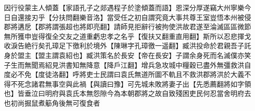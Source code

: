 因行役蒙主人傾蓋【家語孔子之郯遇程子於塗傾蓋而語】恩深分厚遂竊大州寧樂今日自還接刃乎【分扶問翻樂音洛】當受任之初自謂究竟大事共尊王室豈悟本州被侵郡將遘戹【郡將謂張超也將即亮翻】請師見拒辭行被拘使洪故君遂至淪滅區區微節無所獲申豈得復全交友之道重虧忠孝之名乎【復扶又翻重直用翻】斯所以忍悲揮戈收淚告絶行矣孔璋足下徼利於境外【陳琳字孔璋徼一遥翻】臧洪投命於君親吾子託身於盟主【盟主謂袁紹也】臧洪策名於長安【帝在長安】子謂余身死而名滅僕亦笑子生而無聞焉紹見洪書知無降意【降戶江翻】增兵急攻城中糧穀已盡外無彊救洪自度必不免【度徒洛翻】呼將吏士民謂曰袁氏無道所圖不軌且不救洪郡將洪於大義不得不死念諸君無事空與此禍【與讀曰豫】可先城未敗將妻子出【先悉薦翻將如字領也】皆垂泣曰明府與袁氏本無怨隙今為本朝郡將之故自致殘困吏民何忍當舍明府去也初尚掘鼠煮䈥角後無可復食者
